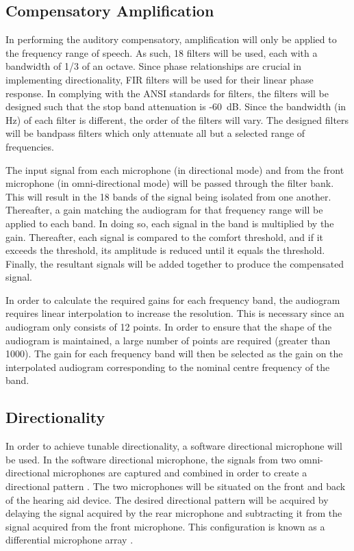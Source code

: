\documentclass[10pt,twocolumn]{witseiepaper}
\begin{document}
\subsection{Compensatory Amplification} \label{sec:amplification}
In performing the auditory compensatory, amplification will only be applied to the frequency range of speech. As such, 18 filters will be used, each with a bandwidth of 1/3 of an octave. Since phase relationships are crucial in implementing directionality, FIR filters will be used for their linear phase response. In complying with the ANSI standards for filters, the filters will be designed such that the stop band attenuation is -60~dB. Since the bandwidth (in Hz) of each filter is different, the order of the filters will vary. The designed filters will be bandpass filters which only attenuate all but a selected range of frequencies.

The input signal from each microphone (in directional mode) and from the front microphone (in omni-directional mode) will be passed through the filter bank. This will result in the 18 bands of the signal being isolated from one another. Thereafter, a gain matching the audiogram for that frequency range will be applied to each band. In doing so, each signal in the band is multiplied by the gain. Thereafter, each signal is compared to the comfort threshold, and if it exceeds the threshold, its amplitude is reduced until it equals the threshold. Finally, the resultant signals will be added together to produce the compensated signal. 

In order to calculate the required gains for each frequency band, the audiogram requires linear interpolation to increase the resolution. This is necessary since an audiogram only consists of 12 points. In order to ensure that the shape of the audiogram is maintained, a large number of points are required (greater than 1000). The gain for each frequency band will then be selected as the gain on the interpolated audiogram corresponding to the nominal centre frequency of the band.

\subsection{Directionality} \label{sec:directionality}
In order to achieve tunable directionality, a software directional microphone will be used. In the software directional microphone, the signals from two omni-directional microphones are captured and combined in order to create a directional pattern \cite{Distortion_of_interaural_time_cues}. The two microphones will be situated on the front and back of the hearing aid device. The desired directional pattern will be acquired by delaying the signal acquired by the rear microphone and subtracting it from the signal acquired from the front microphone. This configuration is known as a differential microphone array \cite{Distortion_of_interaural_time_cues}.
\end{document}
